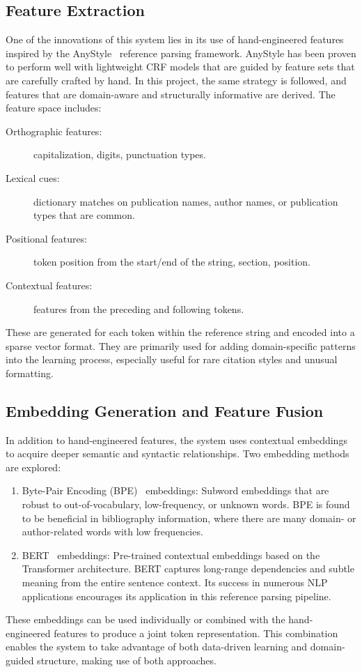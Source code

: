 \subsection{Feature Extraction}
One of the innovations of this system lies in its use of hand-engineered features inspired by the AnyStyle~\cite{anystyle} reference parsing framework. AnyStyle has been proven to perform well with lightweight CRF models that are guided by feature sets that are carefully crafted by hand. In this project, the same strategy is followed, and features that are domain-aware and structurally informative are derived.
The feature space includes:
\begin{description}
\item[Orthographic features:] capitalization, digits, punctuation types.
\item[Lexical cues:] dictionary matches on publication names, author names, or publication types that are common.
\item[Positional features:] token position from the start/end of the string, section, position.
\item[Contextual features:] features from the preceding and following tokens.
\end{description}
These are generated for each token within the reference string and encoded into a sparse vector format. They are primarily used for adding domain-specific patterns into the learning process, especially useful for rare citation styles and unusual formatting.

\subsection{Embedding Generation and Feature Fusion}
In addition to hand-engineered features, the system uses contextual embeddings to acquire deeper semantic and syntactic relationships. Two embedding methods are explored:
\begin{enumerate}
\item Byte-Pair Encoding (BPE)~\cite{bpemb} embeddings: Subword embeddings that are robust to out-of-vocabulary, low-frequency, or unknown words. BPE is found to be beneficial in bibliography information, where there are many domain- or author-related words with low frequencies.
\item BERT~\cite{2019-bert} embeddings: Pre-trained contextual embeddings based on the Transformer architecture. BERT captures long-range dependencies and subtle meaning from the entire sentence context. Its success in numerous NLP applications encourages its application in this reference parsing pipeline.
\end{enumerate}
These embeddings can be used individually or combined with the hand-engineered features to produce a joint token representation. This combination enables the system to take advantage of both data-driven learning and domain-guided structure, making use of both approaches.

